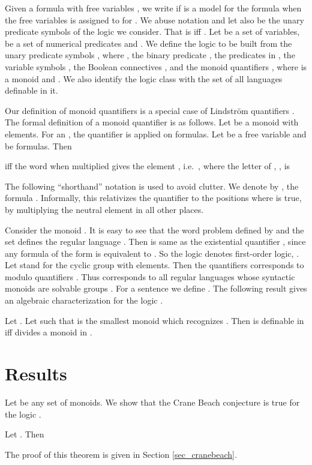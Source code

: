 \documentclass[envcountsame]{llncs}
\begin{document}
Given a formula  with free variables , we write  if  is a model for the formula  when the free variables  is assigned to  for .
We abuse notation and let  also be the unary predicate symbols of the logic we consider. That is  iff . 
Let  be a set of variables,  be a set of numerical predicates and . We define the
logic  to be built from the unary predicate symbols , where , the binary predicate ,
the predicates in , the variable symbols , the Boolean connectives , and the monoid
quantifiers , where  is a monoid and . We also identify the logic class  with the set of all languages definable in it.

Our definition of monoid quantifiers is a special case of Lindstr\"om quantifiers \cite{lin_genQuant}. The formal definition of a
monoid quantifier \cite{barr_uniformNC1} is as follows. Let  be a monoid with  elements. For an , the quantifier  is applied on  formulas. Let  be a free variable and  be   formulas. Then 

iff the word  when multiplied gives the element , i.e.\  , where the  letter of , , is 


The following ``shorthand'' notation is used to avoid clutter. We denote by , the formula
. Informally, this relativizes the quantifier to the positions where  is true, by multiplying the neutral element in all other places.

Consider the monoid . It is easy to see that the word problem defined by  and the set  defines the regular language
. Then  is same as the existential quantifier , since any formula of the form  is equivalent
to . So the logic  denotes first-order logic, . Let
 stand for the cyclic group with  elements. Then the quantifiers  corresponds to modulo quantifiers
\cite{str_regGenQnt}. Thus  corresponds to all regular languages whose syntactic monoids are solvable groups
\cite{str_cirBook}. 
For a sentence  we define .
The following result gives an algebraic characterization for the logic .
\begin{lemma}
\label{lem_logicalgb}
Let . 
Let  such that  is the smallest monoid which recognizes . 
Then  is definable in  iff  divides a monoid in .
\end{lemma}
\bigskip
\section{Results}\label{sec_result} 
Let  be any set of monoids. 
We show that the Crane Beach conjecture is true for the logic .
\begin{theorem}
\label{thm_cbconj}
 Let . Then 
\end{theorem}
The proof of this theorem is given in Section \ref{sec_cranebeach}.
\end{document}
